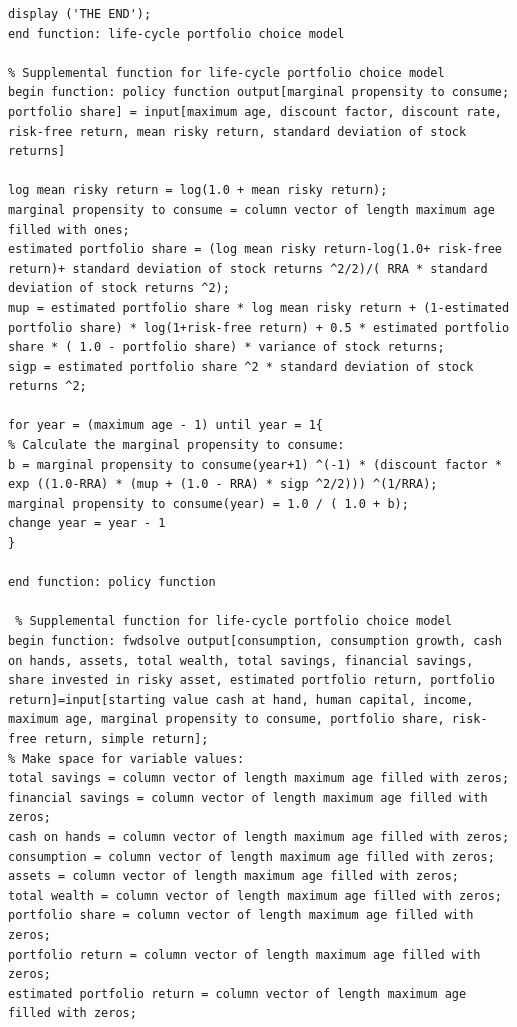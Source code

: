 \documentclass[12pt,a4paper]{article}
\begin{document}
\begin{lstlisting}[frame=single]
display ('THE END');
end function: life-cycle portfolio choice model

% Supplemental function for life-cycle portfolio choice model
begin function: policy function output[marginal propensity to consume; portfolio share] = input[maximum age, discount factor, discount rate, risk-free return, mean risky return, standard deviation of stock returns]

log mean risky return = log(1.0 + mean risky return);
marginal propensity to consume = column vector of length maximum age filled with ones;
estimated portfolio share = (log mean risky return-log(1.0+ risk-free return)+ standard deviation of stock returns ^2/2)/( RRA * standard deviation of stock returns ^2);
mup = estimated portfolio share * log mean risky return + (1-estimated portfolio share) * log(1+risk-free return) + 0.5 * estimated portfolio share * ( 1.0 - portfolio share) * variance of stock returns;
sigp = estimated portfolio share ^2 * standard deviation of stock returns ^2;

for year = (maximum age - 1) until year = 1{
% Calculate the marginal propensity to consume:
b = marginal propensity to consume(year+1) ^(-1) * (discount factor * exp ((1.0-RRA) * (mup + (1.0 - RRA) * sigp ^2/2))) ^(1/RRA);
marginal propensity to consume(year) = 1.0 / ( 1.0 + b);
change year = year - 1
}

end function: policy function

 % Supplemental function for life-cycle portfolio choice model
begin function: fwdsolve output[consumption, consumption growth, cash on hands, assets, total wealth, total savings, financial savings, share invested in risky asset, estimated portfolio return, portfolio return]=input[starting value cash at hand, human capital, income, maximum age, marginal propensity to consume, portfolio share, risk-free return, simple return];
% Make space for variable values:
total savings = column vector of length maximum age filled with zeros;
financial savings = column vector of length maximum age filled with zeros;
cash on hands = column vector of length maximum age filled with zeros;
consumption = column vector of length maximum age filled with zeros;
assets = column vector of length maximum age filled with zeros;
total wealth = column vector of length maximum age filled with zeros;
portfolio share = column vector of length maximum age filled with zeros;
portfolio return = column vector of length maximum age filled with zeros;
estimated portfolio return = column vector of length maximum age filled with zeros;


\end{lstlisting}
\end{document}
